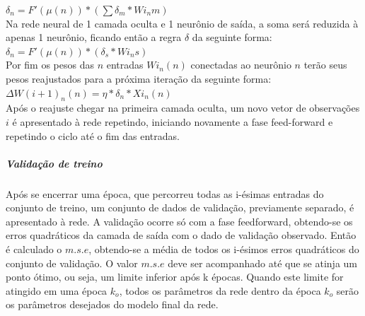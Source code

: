 \documentclass[	12pt, Times, openright, twoside, a4paper, english, brazil]{abntex2}
\begin{document}
            $\delta_n = F'(\mu(n))*(\sum \delta_m*Wi_{n}m)$\\
            
            Na rede neural de 1 camada oculta e 1 neurônio de saída, a soma será reduzida à apenas 1 neurônio, ficando então a regra $\delta$ da seguinte forma:\\
            
            $\delta_n = F'(\mu(n))*(\delta_s*Wi_{n}s)$\\
            
            Por fim os pesos das $n$ entradas $Wi_{n}(n)$ conectadas ao neurônio $n$ terão seus pesos reajustados para a próxima iteração da seguinte forma:\\
            $\Delta W(i+1)_{n}(n) = \eta*\delta_n*Xi_{n}(n)$\\
            
            Após o reajuste chegar na primeira camada oculta, um novo vetor de observações $i$ é apresentado à rede repetindo, iniciando novamente a fase feed-forward e repetindo o ciclo até o fim das entradas.
            
            \begin{figure}[H]
            \end{figure}
           
            \subparagraph{Validação de treino}
                Após se encerrar uma época, que percorreu todas as i-ésimas entradas do conjunto de treino, um conjunto de dados de validação, previamente separado, é apresentado à rede.
                A validação ocorre só com a fase feedforward, obtendo-se os erros quadráticos da camada de saída com o dado de validação observado.
                Então é calculado o $m.s.e$, obtendo-se a média de todos os i-ésimos erros quadráticos do conjunto de validação.
                O valor $m.s.e$ deve ser acompanhado até que se atinja um ponto ótimo, ou seja, um limite inferior após k épocas.
                Quando este limite for atingido em uma época $k_o$, todos os parâmetros da rede dentro da época $k_o$ serão os parâmetros desejados do modelo final da rede.
                
\end{document}
